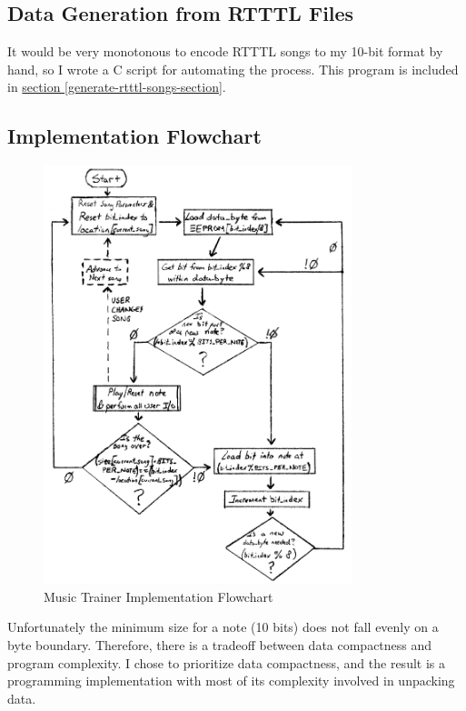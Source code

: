 \documentclass[11pt]{article}
\begin{document}
\subsection{Data Generation from RTTTL Files}

It would be very monotonous to encode RTTTL songs to my 10-bit format by hand,
so I wrote a C script for automating the process. This program is included in
\hyperref[generate-rtttl-songs-section]{section \ref{generate-rtttl-songs-section}}.

\subsection{Implementation Flowchart}

\begin{figure}
\centering
\includegraphics[width=0.8\textwidth]{music-trainer-flowchart.pdf}
\caption{Music Trainer Implementation Flowchart}
\label{music-trainer-flowchart}
\end{figure}

Unfortunately the minimum size for a note (10 bits) does not fall evenly
on a byte boundary. Therefore, there is a tradeoff between data compactness
and program complexity. I chose to prioritize data compactness, and the result
is a programming implementation with most of its complexity involved
in unpacking data.
\end{document}
